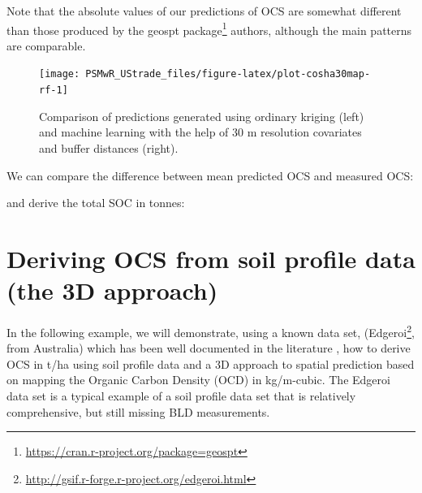 \documentclass[graybox,natbib,nospthms,UStrade]{svmono}
\newenvironment{Shaded}{\begin{snugshade}}{\end{snugshade}}
\newcommand{\CommentTok}[1]{\textcolor[rgb]{0.37,0.37,0.37}{\textit{#1}}}
\newcommand{\DataTypeTok}[1]{\textcolor[rgb]{0.27,0.27,0.27}{#1}}
\newcommand{\DecValTok}[1]{\textcolor[rgb]{0.06,0.06,0.06}{#1}}
\newcommand{\FloatTok}[1]{\textcolor[rgb]{0.06,0.06,0.06}{#1}}
\newcommand{\KeywordTok}[1]{\textcolor[rgb]{0.27,0.27,0.27}{\textbf{#1}}}
\newcommand{\NormalTok}[1]{#1}
\newcommand{\OperatorTok}[1]{\textcolor[rgb]{0.43,0.43,0.43}{\textbf{#1}}}
\newcommand{\OtherTok}[1]{\textcolor[rgb]{0.37,0.37,0.37}{#1}}
\renewcommand{\href}[2]{#2 (\url{#1})}
\renewcommand{\href}[2]{#2\footnote{\url{#1}}}
\begin{document}
Note that the absolute values of our predictions of OCS are somewhat different than those produced by the \href{https://cran.r-project.org/package=geospt}{geospt package} authors, although the main patterns are comparable.

\begin{figure}[H]

{\centering \texttt{[image: PSMwR\_UStrade\_files/figure-latex/plot-cosha30map-rf-1]} 

}

\caption{Comparison of predictions generated using ordinary kriging (left) and machine learning with the help of 30 m resolution covariates and buffer distances (right).}\label{fig:plot-cosha30map-rf}
\end{figure}

We can compare the difference between mean predicted OCS and measured OCS:

\begin{Shaded}
\end{Shaded}

and derive the total SOC in tonnes:

\begin{Shaded}
\end{Shaded}

\hypertarget{ocs-3d-approach}{%
\section{Deriving OCS from soil profile data (the 3D approach)}\label{ocs-3d-approach}}

In the following example, we will demonstrate, using a known data set, (\href{http://gsif.r-forge.r-project.org/edgeroi.html}{Edgeroi}, from Australia) which has been well documented in the literature \citep{Malone2009Geoderma}, how to derive OCS in t/ha using soil profile data and a 3D approach to spatial prediction based on mapping the Organic Carbon Density (OCD) in kg/m-cubic. The Edgeroi data set is a typical example of a soil profile data set that is relatively comprehensive, but still missing BLD measurements.
\end{document}
